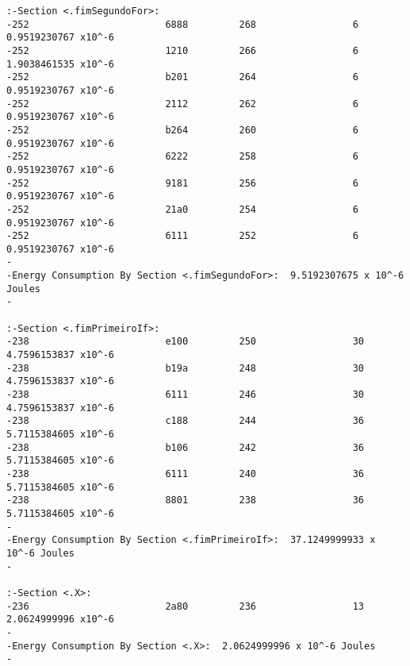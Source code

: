 \begin{verbatim}
:-Section <.fimSegundoFor>:  
-252                        6888         268                 6              0.9519230767 x10^-6 
-252                        1210         266                 6              1.9038461535 x10^-6 
-252                        b201         264                 6              0.9519230767 x10^-6 
-252                        2112         262                 6              0.9519230767 x10^-6 
-252                        b264         260                 6              0.9519230767 x10^-6 
-252                        6222         258                 6              0.9519230767 x10^-6 
-252                        9181         256                 6              0.9519230767 x10^-6 
-252                        21a0         254                 6              0.9519230767 x10^-6 
-252                        6111         252                 6              0.9519230767 x10^-6 
-                                                                                          
-Energy Consumption By Section <.fimSegundoFor>:  9.5192307675 x 10^-6 Joules
-                                                                                          

:-Section <.fimPrimeiroIf>:  
-238                        e100         250                 30              4.7596153837 x10^-6 
-238                        b19a         248                 30              4.7596153837 x10^-6 
-238                        6111         246                 30              4.7596153837 x10^-6 
-238                        c188         244                 36              5.7115384605 x10^-6 
-238                        b106         242                 36              5.7115384605 x10^-6 
-238                        6111         240                 36              5.7115384605 x10^-6 
-238                        8801         238                 36              5.7115384605 x10^-6 
-                                                                                          
-Energy Consumption By Section <.fimPrimeiroIf>:  37.1249999933 x 10^-6 Joules
-                                                                                          

:-Section <.X>:  
-236                        2a80         236                 13              2.0624999996 x10^-6 
-                                                                                          
-Energy Consumption By Section <.X>:  2.0624999996 x 10^-6 Joules
-                                                                                          


\end{verbatim}
